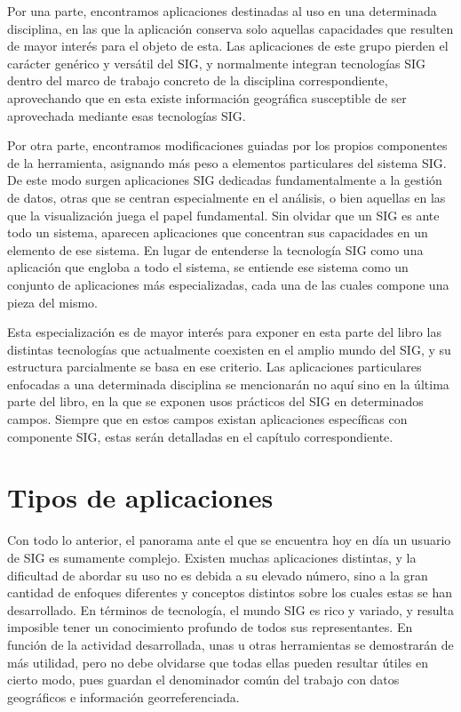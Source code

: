 Por una parte, encontramos aplicaciones destinadas al uso en una determinada disciplina, en las que la aplicación conserva solo aquellas capacidades que resulten de mayor interés para el objeto de esta. Las aplicaciones de este grupo pierden el carácter genérico y versátil del SIG, y normalmente integran tecnologías SIG dentro del marco de trabajo concreto de la disciplina correspondiente, aprovechando que en esta existe información geográfica susceptible de ser aprovechada mediante esas tecnologías SIG.

Por otra parte, encontramos modificaciones guiadas por los propios componentes de la herramienta, asignando más peso a elementos particulares del sistema SIG. De este modo surgen aplicaciones SIG dedicadas fundamentalmente a la gestión de datos, otras que se centran especialmente en el análisis, o bien aquellas en las que la visualización juega el papel fundamental. Sin olvidar que un SIG es ante todo un sistema, aparecen aplicaciones que concentran sus capacidades en un elemento de ese sistema. En lugar de entenderse la tecnología SIG como una aplicación que engloba a todo el sistema, se entiende ese sistema como un conjunto de aplicaciones más especializadas, cada una de las cuales compone una pieza del mismo.

Esta especialización es de mayor interés para exponer en esta parte del libro las distintas tecnologías que actualmente coexisten en el amplio mundo del SIG, y su estructura parcialmente se basa en ese criterio. Las aplicaciones particulares enfocadas a una determinada disciplina se mencionarán no aquí sino en la última parte del libro, en la que se exponen usos prácticos del SIG en determinados campos. Siempre que en estos campos existan aplicaciones específicas con componente SIG, estas serán detalladas en el capítulo correspondiente.

\section{Tipos de aplicaciones}

Con todo lo anterior, el panorama ante el que se encuentra hoy en día un usuario de SIG es sumamente complejo. Existen muchas aplicaciones distintas, y la dificultad de abordar su uso no es debida a su elevado número, sino a la gran cantidad de enfoques diferentes y conceptos distintos sobre los cuales estas se han desarrollado. En términos de tecnología, el mundo SIG es rico y variado, y resulta imposible tener un conocimiento profundo de todos sus representantes. En función de la actividad desarrollada, unas u otras herramientas se demostrarán de más utilidad, pero no debe olvidarse que todas ellas pueden resultar útiles en cierto modo, pues guardan el denominador común del trabajo con datos geográficos e información georreferenciada.


